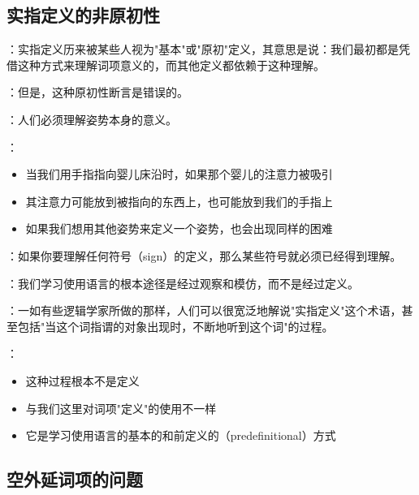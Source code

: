 \subsection{实指定义的非原初性}

\begin{theorembox}[title=关于基本性的误解]
：实指定义历来被某些人视为"基本"或"原初"定义，其意思是说：我们最初都是凭借这种方式来理解词项意义的，而其他定义都依赖于这种理解。

：但是，这种原初性断言是错误的。
\end{theorembox}

\begin{theorembox}[title=姿势理解的前提性]
：人们必须理解姿势本身的意义。

：
\begin{itemize}
  \item 当我们用手指指向婴儿床沿时，如果那个婴儿的注意力被吸引
  \item 其注意力可能放到被指向的东西上，也可能放到我们的手指上
  \item 如果我们想用其他姿势来定义一个姿势，也会出现同样的困难
\end{itemize}

：如果你要理解任何符号（sign）的定义，那么某些符号就必须已经得到理解。

：我们学习使用语言的根本途径是经过观察和模仿，而不是经过定义。
\end{theorembox}

\begin{theorembox}[title=术语使用的混淆]
：一如有些逻辑学家所做的那样，人们可以很宽泛地解说"实指定义"这个术语，甚至包括"当这个词指谓的对象出现时，不断地听到这个词"的过程。

：
\begin{itemize}
  \item 这种过程根本不是定义
  \item 与我们这里对词项"定义"的使用不一样
  \item 它是学习使用语言的基本的和前定义的（predefinitional）方式
\end{itemize}
\end{theorembox}

\subsection{空外延词项的问题}


